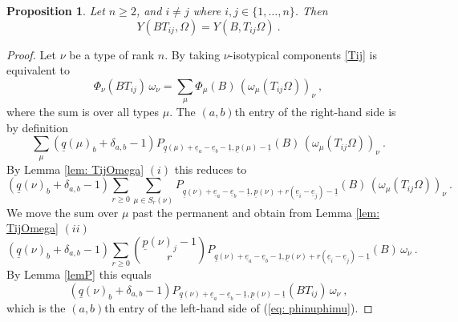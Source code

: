 \documentclass[10pt]{amsart}
\newcommand{\pp}{{\underline{p}}}
\newcommand{\qq}{{\underline{q}}}
\newcommand{\eee}{{\underline{e}}}
\newcommand{\one}{{\underline{1}}}
\theoremstyle{plain}
\newtheorem{prop}[thm]{Proposition}
\newcommand{\0}{\color{blue}{\mathsf{0}}}
\begin{document}
\begin{prop}\label{propTij}
Let $n\geq2$,  and $i\neq j$ where $i,j \in \{1,\ldots, n\}$. Then  
\begin{equation}\label{Tij}
Y(BT_{ij},\Omega)=Y(B,T_{ij}\Omega) \ . 
\end{equation}
\end{prop}

\begin{proof} Let $\nu$ be a type of rank $n$.  By taking $\nu$-isotypical components \eqref{Tij} is equivalent to 
\begin{equation}\label{eq: phinuphimu}
\Phi_{\nu}(B T_{ij})\,  \omega_{\nu} =     \sum_{\mu}  \Phi_{\mu}(B) \, (\omega_{\mu}(T_{ij} \Omega))_{\nu}\ ,    
\end{equation}
where the sum is over all types $\mu$.
 The $(a,b)$th entry of the right-hand side is by definition
 \[ \sum_{\mu}  ( \qq(\mu)_{b} + \delta_{a,b}-1)     P_{\qq(\mu) + \eee_a -\eee_b-\one, \pp(\mu)-\one}(B)  
  \,  (\omega_{\mu}(T_{ij} \Omega))_{\nu} \ . 
 \]
 By Lemma \ref{lem: TijOmega} $(i)$ this reduces to 
 $$
 ( \qq(\nu)_{b} + \delta_{a,b}-1)  \sum_{r\geq 0 }  \sum_{\mu \in S_r(\nu)}      P_{\qq(\nu) + \eee_a -\eee_b-\one, \pp(\nu)+r(\eee_i -\eee_j)-\one}(B)  
  \,  (\omega_{\mu}(T_{ij} \Omega))_{\nu}\ .
$$
We move the sum over $\mu$ past the permanent and obtain from Lemma \ref{lem: TijOmega} $(ii)$
$$
( \qq(\nu)_{b} + \delta_{a,b}-1)  \sum_{r\geq 0 }   \binom{\pp(\nu)_j-1}{r}     P_{\qq(\nu) + \eee_a -\eee_b-\one, \pp(\nu)+r(\eee_i -\eee_j)-\one}(B)      \nonumber    
  \,  \omega_{\nu} \ .
$$
By Lemma \ref{lemP} this equals
\[( \qq(\nu)_{b} + \delta_{a,b}-1) P_{\qq(\nu) + \eee_a -\eee_b-\one, \pp(\nu)-\one}(BT_{ij})\,\omega_\nu\ ,\]
which is the $(a,b)$th entry of the left-hand side of (\ref{eq: phinuphimu}).
\end{proof}
\end{document}
